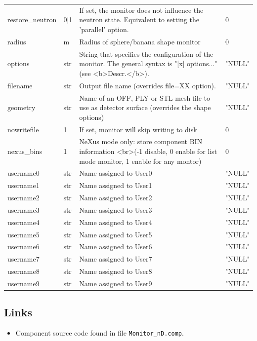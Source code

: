 \begin{longtable}{p{}p{}p{}p{}}
restore\_neutron & 0|1 & If set, the monitor does not influence the neutron state. Equivalent to setting the 'parallel' option. & 0 \\
radius & m & Radius of sphere/banana shape monitor & 0 \\
options & str & String that specifies the configuration of the monitor. The general syntax is "[x] options..." (see \textless{}b\textgreater{}Descr.\textless{}/b\textgreater{}). & "NULL" \\
filename & str & Output file name (overrides file=XX option). & "NULL" \\
geometry & str & Name of an OFF, PLY or STL mesh file to use as detector surface (overrides the shape options) & "NULL" \\
nowritefile & 1 & If set, monitor will skip writing to disk & 0 \\
nexus\_bins & 1 & NeXus mode only: store component BIN information \textless{}br\textgreater{}(-1 disable, 0 enable for list mode monitor, 1 enable for any montor) & 0 \\
username0 & str & Name assigned to User0 & "NULL" \\
username1 & str & Name assigned to User1 & "NULL" \\
username2 & str & Name assigned to User2 & "NULL" \\
username3 & str & Name assigned to User3 & "NULL" \\
username4 & str & Name assigned to User4 & "NULL" \\
username5 & str & Name assigned to User5 & "NULL" \\
username6 & str & Name assigned to User6 & "NULL" \\
username7 & str & Name assigned to User7 & "NULL" \\
username8 & str & Name assigned to User8 & "NULL" \\
username9 & str & Name assigned to User9 & "NULL" \\
\bottomrule
\end{longtable}

\subsection*{Links}
\begin{itemize}
  \item Component source code found in file \texttt{Monitor\_nD.comp}.
\end{itemize}
